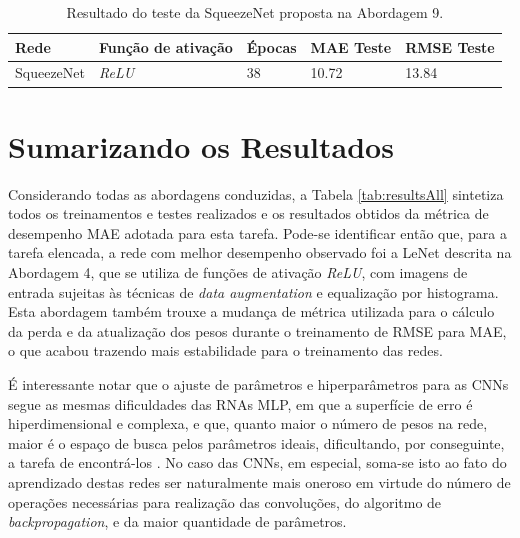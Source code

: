 	\begin{table}[!ht]
	\centering
	\caption{Resultado do teste da SqueezeNet proposta na Abordagem 9.}
	\label{tab:results-9}
		\begin{tabular}{l l l l l }
			\toprule
			Rede & Função de ativação & Épocas & MAE Teste & RMSE Teste \\
			\midrule
			SqueezeNet & \emph{ReLU} & 38 & 10.72 & 13.84 \\
			\bottomrule
		\end{tabular}
	\end{table}

\section{Sumarizando os Resultados}

Considerando todas as abordagens conduzidas, a Tabela \ref{tab:resultsAll} sintetiza todos os treinamentos e testes realizados e os resultados obtidos da métrica de desempenho MAE adotada para esta tarefa. Pode-se identificar então que, para a tarefa elencada, a rede com melhor desempenho observado foi a LeNet descrita na Abordagem 4, que se utiliza de funções de ativação \emph{ReLU}, com imagens de entrada sujeitas às técnicas de \emph{data augmentation} e equalização por histograma. Esta abordagem também trouxe a mudança de métrica utilizada para o cálculo da perda e da atualização dos pesos durante o treinamento de RMSE para MAE, o que acabou trazendo mais estabilidade para o treinamento das redes.



É interessante notar que o ajuste de parâmetros e hiperparâmetros para as CNNs segue as mesmas dificuldades das RNAs MLP, em que a superfície de erro é hiperdimensional e complexa, e que, quanto maior o número de pesos na rede, maior é o espaço de busca pelos parâmetros ideais, dificultando, por conseguinte, a tarefa de encontrá-los \cite{Teresa:Livro}. No caso das CNNs, em especial, soma-se isto ao fato do aprendizado destas redes ser naturalmente mais oneroso em virtude do número de operações necessárias para realização das convoluções, do algoritmo de \emph{backpropagation}, e da maior quantidade de parâmetros.
